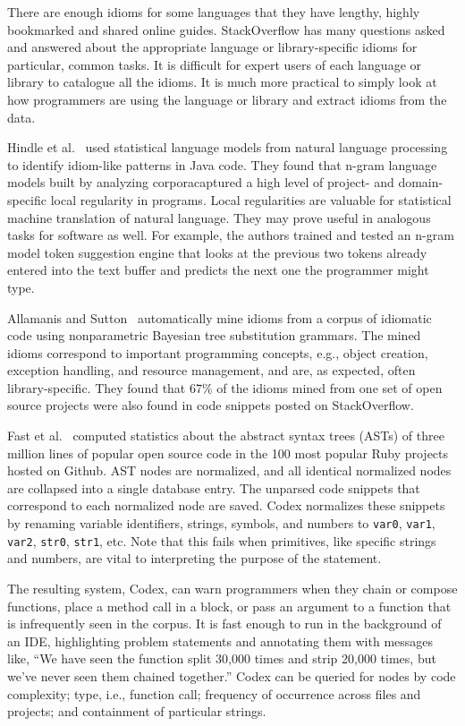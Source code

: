 There are enough idioms for some languages that they have lengthy, highly bookmarked and shared online guides. StackOverflow has many questions asked and answered about the appropriate language or library-specific idioms for particular, common tasks. It is difficult for expert users of each language or library to catalogue all the idioms. It is much more practical to simply look at how programmers are using the language or library and extract idioms from the data.

Hindle et al.~\cite{Hindle2012} used statistical language models from natural language processing to identify idiom-like patterns in Java code. They found that n-gram language models built by analyzing corporacaptured a high level of project- and domain-specific local regularity in programs. Local regularities are valuable for statistical machine translation of natural language. They may prove useful in analogous tasks for software as well. For example, the authors trained and tested an n-gram model token suggestion engine that looks at the previous two tokens already entered into the text buffer and predicts the next one the programmer might type.

Allamanis and Sutton~\cite{allamanis2014mining} automatically mine idioms from a corpus of idiomatic code using nonparametric Bayesian tree substitution grammars. The mined idioms correspond to important programming concepts, e.g., object creation, exception handling, and resource management, and are, as expected, often library-specific. They found that 67\% of the idioms mined from one set of open source projects were also found in code snippets posted on StackOverflow.

Fast et al.~\cite{codex} computed statistics about the abstract syntax trees (ASTs) of three million lines of popular open source code in the 100 most popular Ruby projects hosted on Github. AST nodes are normalized, and all identical normalized nodes are collapsed into a single database entry. The unparsed code snippets that correspond to each normalized node are saved. Codex normalizes these snippets by renaming variable identifiers, strings, symbols, and numbers to \texttt{var0}, \texttt{var1}, \texttt{var2}, \texttt{str0}, \texttt{str1}, etc. Note that this fails when primitives, like specific strings and numbers, are vital to interpreting the purpose of the statement.

The resulting system, Codex, can warn programmers when they chain or compose functions, place a method call in a block, or pass an argument to a function that is infrequently seen in the corpus. It is fast enough to run in the background of an IDE, highlighting problem statements and annotating them with messages like, ``We have seen the function split 30,000 times and strip 20,000 times, but we've never seen them chained together.'' Codex can be queried for nodes by code complexity; type, i.e., function call; frequency of occurrence across files and projects; and containment of particular strings.

